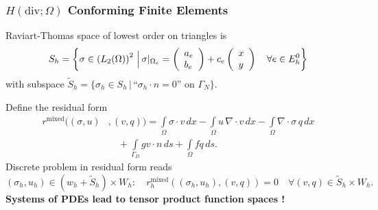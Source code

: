 \begin{frame}
\frametitle{$H(\text{div};\Omega)$ Conforming Finite Elements}
Raviart-Thomas space of lowest order on triangles is
\begin{align*}
S_h = \left\{\sigma\in\left(L_2(\Omega) \right)^2  \,\Bigl|\, \sigma|_{\Omega_e} =
\left(\begin{array}{l} a_e\\ b_e \end{array}\right) + 
c_e \left(\begin{array}{l} x\\ y \end{array}\right) \quad\forall e\in E^0_h
\right\}
\end{align*}
with subspace $\tilde{S}_h = \{\sigma_h\in S_h \,|\, \text{``$\sigma_h\cdot n=0$'' on $\Gamma_N$} \}$.

Define the residual form
\begin{equation*}
\begin{split}
r^\text{mixed}((\sigma,u)&,(v,q)) = 
\int\limits_\Omega \sigma\cdot v \, dx  -\int\limits_\Omega
u \, \nabla\cdot v \, dx 
 - \int\limits_\Omega \nabla\cdot\sigma \, q \, dx\\ 
&\quad + \int\limits_{\Gamma_D} g v\cdot n \, ds + \int\limits_\Omega f q \,
ds .
\end{split}
\end{equation*}
Discrete problem in residual form reads
\begin{equation*}
(\sigma_h, u_h) \in (w_h+\tilde{S}_h)\times W_h : \quad 
r_h^\text{mixed}\left((\sigma_h,u_h),(v,q)\right) = 0 \quad \forall
(v,q) \in \tilde{S}_h\times W_h .
\end{equation*}
\textbf{Systems of PDEs lead to tensor product function spaces !}
\end{frame}

